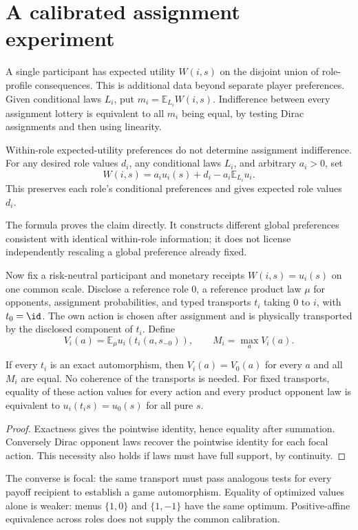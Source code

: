 \section{A calibrated assignment experiment}
A single participant has expected utility $W(i,s)$ on the disjoint union of
role-profile consequences. This is additional data beyond separate player
preferences. Given conditional laws $L_i$, put $m_i=\mathbb E_{L_i}W(i,s)$.
Indifference between every assignment lottery is equivalent to all $m_i$
being equal, by testing Dirac assignments and then using linearity.

\begin{proposition}[A1: underidentification]
Within-role expected-utility preferences do not determine assignment
indifference. For any desired role values $d_i$, any conditional laws $L_i$,
and arbitrary $a_i>0$, set
\[
W(i,s)=a_i u_i(s)+d_i-a_i\mathbb E_{L_i}u_i.
\]
This preserves each role's conditional preferences and gives expected role
values $d_i$.
\end{proposition}
The formula proves the claim directly. It constructs different global
preferences consistent with identical within-role information; it does not
license independently rescaling a global preference already fixed.

Now fix a risk-neutral participant and monetary receipts $W(i,s)=u_i(s)$ on
one common scale. Disclose a reference role 0, a reference product law $\mu$
for opponents, assignment probabilities, and typed transports $t_i$ taking
0 to $i$, with $t_0=\id$. The own action is chosen after assignment and is
physically transported by the disclosed component of $t_i$. Define
\[
V_i(a)=\mathbb E_\mu u_i(t_i(a,s_{-0})),\qquad M_i=\max_a V_i(a).
\]
\begin{proposition}
If every $t_i$ is an exact automorphism, then $V_i(a)=V_0(a)$ for every $a$
and all $M_i$ are equal. No coherence of the transports is needed.
For fixed transports, equality of these action values for every action and
every product opponent law is equivalent to
$u_i(t_i s)=u_0(s)$ for all pure $s$.
\end{proposition}
\begin{proof}
Exactness gives the pointwise identity, hence equality after summation.
Conversely Dirac opponent laws recover the pointwise identity for each focal
action. This necessity also holds if laws must have full support, by continuity.
\end{proof}
The converse is focal: the same transport must pass analogous tests for every
payoff recipient to establish a game automorphism. Equality of optimized values
alone is weaker: menus $\{1,0\}$ and $\{1,-1\}$ have the same optimum.
Positive-affine equivalence across roles does not supply the common calibration.
